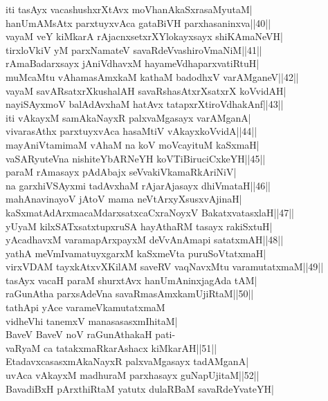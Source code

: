 \documentclass{article}
\begin{document}
iti tasAyx vacashushxrXtAvx moVhanAkaSxrasaMyutaM|\\
hanUmAMsAtx parxtuyxvAca gataBiVH parxhasaninxva||40||\\
vayaM veY kiMkarA rAjacnxsetxrXYlokayxsayx shiKAmaNeVH|\\
tirxloVkiV yM parxNamateV savaRdeVvashiroVmaNiM||41||\\
rAmaBadarxsayx jAniVdhavxM hayameVdhaparxvatiRtuH|\\
muMcaMtu vAhamasAmxkaM kathaM badodhxV varAMganeV||42||\\
vayaM savARsatxrXkushalAH savaRshasAtxrXsatxrX koVvidAH|\\
nayiSAyxmoV balAdAvxhaM hatAvx tatapxrXtiroVdhakAnf||43||\\
iti vAkayxM samAkaNayxR palxvaMgasayx varAMganA|\\
vivarasAthx parxtuyxvAca hasaMtiV vAkayxkoVvidA||44||\\
mayAniVtamimaM vAhaM na koV moVcayituM kaSxmaH|\\
vaSARyuteVna nishiteYbARNeYH koVTiBiruciCxkeYH||45||\\
paraM rAmasayx pAdAbajx seVvakiVkamaRkAriNiV|\\
na garxhiVSAyxmi tadAvxhaM rAjarAjasayx dhiVmataH||46||\\
mahAnavinayoV jAtoV mama neVtArxyXsusxvAjinaH|\\
kaSxmatAdArxmacaMdarxsatxcaCxraNoyxV BakatxvatasxlaH||47||\\
yUyaM kilxSATxsatxtupxruSA hayAthaRM tasayx rakiSxtuH|\\
yAcadhavxM varamapArxpayxM deVvAnAmapi satatxmAH||48||\\
yathA meVmIvamatuyxgarxM kaSxmeVta puruSoVtatxmaH|\\
virxVDAM tayxkAtxvXKilAM saveRV vaqNavxMtu varamutatxmaM||49||\\
tasAyx vacaH paraM shurxtAvx hanUmAninxjagAda tAM|\\
raGunAtha parxsAdeVna savaRmasAmxkamUjiRtaM||50||\\
tathApi yAce varameVkamutatxmaM\\
vidheVhi tanemxV manasasasxmIhitaM|\\
BaveV BaveV noV raGunAthakaH pati-\\
vaRyaM ca tatakxmaRkarAshacx kiMkarAH||51||\\
EtadavxcasasxmAkaNayxR palxvaMgasayx tadAMganA|\\
uvAca vAkayxM madhuraM parxhasayx guNapUjitaM||52||\\
BavadiBxH pArxthiRtaM yatutx dulaRBaM savaRdeYvateYH|\\
\end{document}
